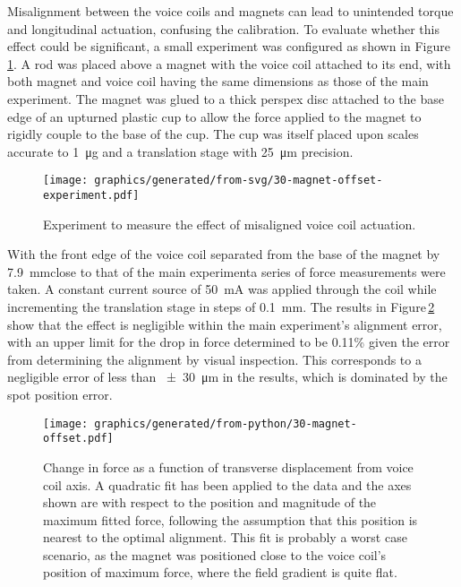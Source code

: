Misalignment between the voice coils and magnets can lead to unintended torque and longitudinal actuation, confusing the calibration. To evaluate whether this effect could be significant, a small experiment was configured as shown in Figure\,\ref{fig:misaligned-voice-coil-experiment}. A rod was placed above a magnet with the voice coil attached to its end, with both magnet and voice coil having the same dimensions as those of the main experiment. The magnet was glued to a thick perspex disc attached to the base edge of an upturned plastic cup to allow the force applied to the magnet to rigidly couple to the base of the cup. The cup was itself placed upon scales accurate to \SI{1}{\micro\gram} and a translation stage with \SI{25}{\micro\meter} precision.

\begin{figure}
  \centering
  \texttt{[image: graphics/generated/from-svg/30-magnet-offset-experiment.pdf]}
  \caption{\label{fig:misaligned-voice-coil-experiment}Experiment to measure the effect of misaligned voice coil actuation.}
\end{figure}

With the front edge of the voice coil separated from the base of the magnet by \SI{7.9}{\milli\meter}\textemdash close to that of the main experiment\textemdash a series of force measurements were taken. A constant current source of \SI{50}{\milli\ampere} was applied through the coil while incrementing the translation stage in steps of \SI{0.1}{\milli\meter}. The results in Figure\,\ref{fig:misaligned-voice-coil-results} show that the effect is negligible within the main experiment's alignment error, with an upper limit for the drop in force determined to be \SI{0.11}{}\% given the error from determining the alignment by visual inspection. This corresponds to a negligible error of less than \SI{\pm30}{\micro\meter} in the results, which is dominated by the spot position error.


\begin{figure}
  \centering
  \texttt{[image: graphics/generated/from-python/30-magnet-offset.pdf]}
  \caption{\label{fig:misaligned-voice-coil-results}Change in force as a function of transverse displacement from voice coil axis. A quadratic fit has been applied to the data and the axes shown are with respect to the position and magnitude of the maximum fitted force, following the assumption that this position is nearest to the optimal alignment. This fit is probably a worst case scenario, as the magnet was positioned close to the voice coil's position of maximum force, where the field gradient is quite flat. }
\end{figure}


